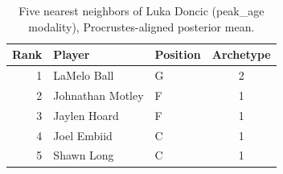 \begin{table}[htbp]
  \centering\small
  \begin{tabular}{rllc}
    \toprule
    Rank & Player & Position & Archetype \\
    \midrule
    1 & LaMelo Ball & G & 2 \\
    2 & Johnathan Motley & F & 1 \\
    3 & Jaylen Hoard & F & 1 \\
    4 & Joel Embiid & C & 1 \\
    5 & Shawn Long & C & 1 \\
    \bottomrule
  \end{tabular}
  \caption{Five nearest neighbors of Luka Doncic (peak_age modality), Procrustes-aligned posterior mean.}
  \label{tab:Luka_Doncic_neighbors_peak_age}
\end{table}

